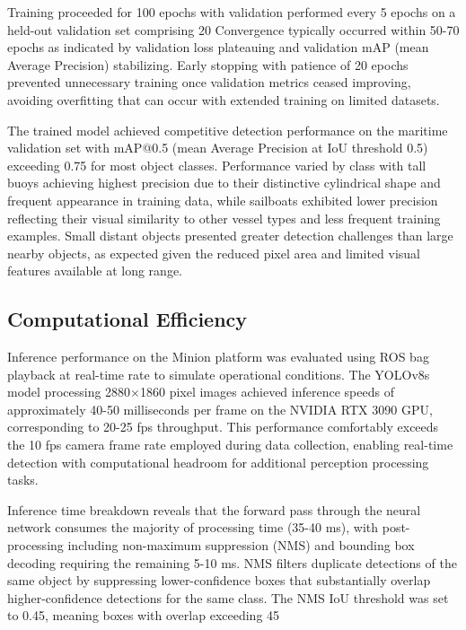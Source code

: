 \documentclass{erauthesis}
\begin{document}
Training proceeded for 100 epochs with validation performed every 5 epochs on a held-out validation set comprising 20%
Convergence typically occurred within 50-70 epochs as indicated by validation loss plateauing and validation mAP (mean Average Precision) stabilizing.
Early stopping with patience of 20 epochs prevented unnecessary training once validation metrics ceased improving, avoiding overfitting that can occur with extended training on limited datasets.

The trained model achieved competitive detection performance on the maritime validation set with mAP@0.5 (mean Average Precision at IoU threshold 0.5) exceeding 0.75 for most object classes.
Performance varied by class with tall buoys achieving highest precision due to their distinctive cylindrical shape and frequent appearance in training data, while sailboats exhibited lower precision reflecting their visual similarity to other vessel types and less frequent training examples.
Small distant objects presented greater detection challenges than large nearby objects, as expected given the reduced pixel area and limited visual features available at long range.

\subsection{Computational Efficiency} \label{sec:yolo_efficiency}

Inference performance on the Minion platform was evaluated using ROS bag playback at real-time rate to simulate operational conditions.
The YOLOv8s model processing 2880×1860 pixel images achieved inference speeds of approximately 40-50 milliseconds per frame on the NVIDIA RTX 3090 GPU, corresponding to 20-25 \ac{fps} throughput.
This performance comfortably exceeds the 10 \ac{fps} camera frame rate employed during data collection, enabling real-time detection with computational headroom for additional perception processing tasks.

Inference time breakdown reveals that the forward pass through the neural network consumes the majority of processing time (35-40 ms), with post-processing including non-maximum suppression (NMS) and bounding box decoding requiring the remaining 5-10 ms.
NMS filters duplicate detections of the same object by suppressing lower-confidence boxes that substantially overlap higher-confidence detections for the same class.
The NMS IoU threshold was set to 0.45, meaning boxes with overlap exceeding 45%
\end{document}
